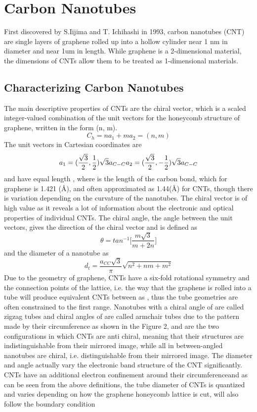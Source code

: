 \section{Carbon Nanotubes}
First discovered by S.Iijima and T. Ichihashi in 1993, carbon nanotubes (CNT) are single layers of graphene rolled up into a hollow cylinder near 1 nm in diameter and near 1um in length. While graphene is a 2-dimensional material, the dimensions of CNTs allow them to be treated as 1-dimensional materials.

\subsection{Characterizing Carbon Nanotubes}
 The main descriptive properties of CNTs are the chiral vector, which is a scaled integer-valued combination of the unit vectors for the honeycomb structure of graphene, written in the form (n, m).
\begin{equation}
	C_h = na_1 + ma_2 = (n, m)
\end{equation}
The unit vectors in Cartesian coordinates are
\begin{equation}
	a_1 = (\frac{\sqrt3}{2}, \frac{1}{2})\sqrt{3}a_{C-C}\\
	a_2 = (\frac{\sqrt3}{2}, -\frac{1}{2})\sqrt{3}a_{C-C}
\end{equation}
and have equal length ,  where  is the length of the carbon bond, which for graphene is 1.421 (\AA), and often approximated as 1.44(\AA) for CNTs, though there is variation depending on the curvature of the nanotubes\cite{saito}. 
The chiral vector is of high value as it reveals a lot of information about the electronic and optical properties of individual CNTs. The chiral angle, the angle between the unit vectors, gives the direction of the chiral vector and is defined as
\begin{equation}
	\theta = tan^{-1}\Bigg[\frac{m\sqrt{3}}{m + 2n}\Bigg]
\end{equation}
and the diameter of a nanotube as  
\begin{equation}
	d_t = \frac{a_{CC}\sqrt{3}}{\pi} \sqrt{n^2 + nm + m^2}
\end{equation}
Due to the geometry of graphene, CNTs have a six-fold rotational symmetry and the connection points of the lattice, i.e. the way that the graphene is rolled into a tube will produce equivalent CNTs between  as , thus the tube geometries are often constrained to the first range. Nanotubes with a chiral angle of  are called zigzag tubes and chiral angles of  are called armchair tubes due to the pattern made by their circumference as shown in the Figure 2, and are the two configurations in which CNTs are anti chiral, meaning that their structures are indistinguishable from their mirrored image, while all in between-angled nanotubes are chiral, i.e. distinguishable from their mirrored image. The diameter and angle actually vary the electronic band structure of the CNT significantly. CNTs have an additional electron confinement around their circumference\cite{yamashita}and as can be seen from the above definitions, the tube diameter of CNTs is quantized and varies depending on how the graphene honeycomb lattice is cut, will also follow the boundary condition
